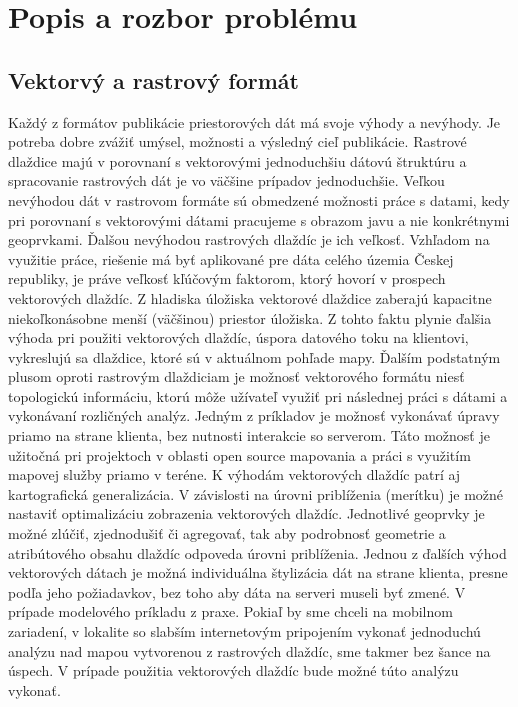 \documentclass[12pt]{article}
\begin{document}
\clearpage 
\section{Popis a rozbor problému}

\subsection{Vektorvý a rastrový formát}
Každý z formátov publikácie priestorových dát má svoje výhody a nevýhody. Je potreba dobre zvážiť umýsel, možnosti a výsledný cieľ publikácie. Rastrové dlaždice majú v porovnaní s vektorovými jednoduchšiu dátovú štruktúru a spracovanie rastrových dát je vo väčšine prípadov jednoduchšie. Veľkou nevýhodou dát v rastrovom formáte sú obmedzené možnosti práce s datami, kedy pri porovnaní s vektorovými dátami pracujeme s obrazom javu a nie konkrétnymi geoprvkami. Ďalšou nevýhodou rastrových dlaždíc je ich veľkosť. Vzhľadom na využitie práce, riešenie má byť aplikované pre dáta celého územia Českej republiky, je práve veľkosť kľúčovým faktorom, ktorý hovorí v prospech vektorových dlaždíc. Z hladiska úložiska vektorové dlaždice zaberajú kapacitne niekoľkonásobne menší (väčšinou) priestor úložiska. Z tohto faktu plynie ďalšia výhoda pri použiti vektorových dlaždíc, úspora datového toku na klientovi, vykreslujú sa dlaždice, ktoré sú v aktuálnom pohľade mapy. 
\newline Ďalším podstatným plusom oproti rastrovým dlaždiciam je možnosť vektorového formátu niesť topologickú informáciu, ktorú môže užívateľ využiť pri následnej práci s dátami a vykonávaní rozličných analýz. Jedným z príkladov je možnosť vykonávať úpravy priamo na strane klienta,  bez nutnosti interakcie so serverom. Táto možnosť je užitočná pri projektoch v oblasti open source mapovania a práci s využitím mapovej služby priamo v teréne. 
\newline K výhodám vektorových dlaždíc patrí aj kartografická generalizácia. V závislosti na úrovni priblíženia (merítku) je možné nastaviť optimalizáciu zobrazenia vektorových dlaždíc. Jednotlivé geoprvky je možné zlúčiť, zjednodušiť či agregovať, tak aby podrobnosť geometrie a atribútového obsahu dlaždíc odpoveda úrovni priblíženia.
\newline Jednou z ďalších výhod vektorových dátach je možná individuálna štylizácia dát na strane klienta, presne podľa jeho požiadavkov, bez toho aby dáta na serveri museli byť zmené.
\newline V prípade modelového príkladu z praxe. Pokiaľ by sme chceli na mobilnom zariadení, v lokalite so slabším internetovým pripojením vykonať jednoduchú analýzu nad mapou vytvorenou z rastrových dlaždíc, sme takmer bez šance na úspech. V prípade použitia vektorových dlaždíc bude možné túto analýzu vykonať.
\end{document}
